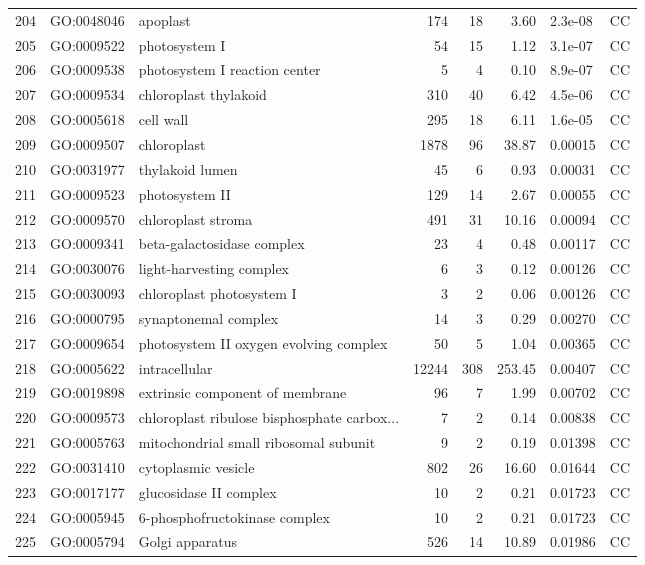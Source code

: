 \documentclass[12pt,oneside,a4paper]{article}
\begin{document}
\begin{longtable}{rllrrrll}
  204 & GO:0048046 & apoplast & 174 &  18 & 3.60 & 2.3e-08 & CC \\ 
  205 & GO:0009522 & photosystem I &  54 &  15 & 1.12 & 3.1e-07 & CC \\ 
  206 & GO:0009538 & photosystem I reaction center &   5 &   4 & 0.10 & 8.9e-07 & CC \\ 
  207 & GO:0009534 & chloroplast thylakoid & 310 &  40 & 6.42 & 4.5e-06 & CC \\ 
  208 & GO:0005618 & cell wall & 295 &  18 & 6.11 & 1.6e-05 & CC \\ 
  209 & GO:0009507 & chloroplast & 1878 &  96 & 38.87 & 0.00015 & CC \\ 
  210 & GO:0031977 & thylakoid lumen &  45 &   6 & 0.93 & 0.00031 & CC \\ 
  211 & GO:0009523 & photosystem II & 129 &  14 & 2.67 & 0.00055 & CC \\ 
  212 & GO:0009570 & chloroplast stroma & 491 &  31 & 10.16 & 0.00094 & CC \\ 
  213 & GO:0009341 & beta-galactosidase complex &  23 &   4 & 0.48 & 0.00117 & CC \\ 
  214 & GO:0030076 & light-harvesting complex &   6 &   3 & 0.12 & 0.00126 & CC \\ 
  215 & GO:0030093 & chloroplast photosystem I &   3 &   2 & 0.06 & 0.00126 & CC \\ 
  216 & GO:0000795 & synaptonemal complex &  14 &   3 & 0.29 & 0.00270 & CC \\ 
  217 & GO:0009654 & photosystem II oxygen evolving complex &  50 &   5 & 1.04 & 0.00365 & CC \\ 
  218 & GO:0005622 & intracellular & 12244 & 308 & 253.45 & 0.00407 & CC \\ 
  219 & GO:0019898 & extrinsic component of membrane &  96 &   7 & 1.99 & 0.00702 & CC \\ 
  220 & GO:0009573 & chloroplast ribulose bisphosphate carbox... &   7 &   2 & 0.14 & 0.00838 & CC \\ 
  221 & GO:0005763 & mitochondrial small ribosomal subunit &   9 &   2 & 0.19 & 0.01398 & CC \\ 
  222 & GO:0031410 & cytoplasmic vesicle & 802 &  26 & 16.60 & 0.01644 & CC \\ 
  223 & GO:0017177 & glucosidase II complex &  10 &   2 & 0.21 & 0.01723 & CC \\ 
  224 & GO:0005945 & 6-phosphofructokinase complex &  10 &   2 & 0.21 & 0.01723 & CC \\ 
  225 & GO:0005794 & Golgi apparatus & 526 &  14 & 10.89 & 0.01986 & CC \\ 

\end{longtable}
\end{document}
